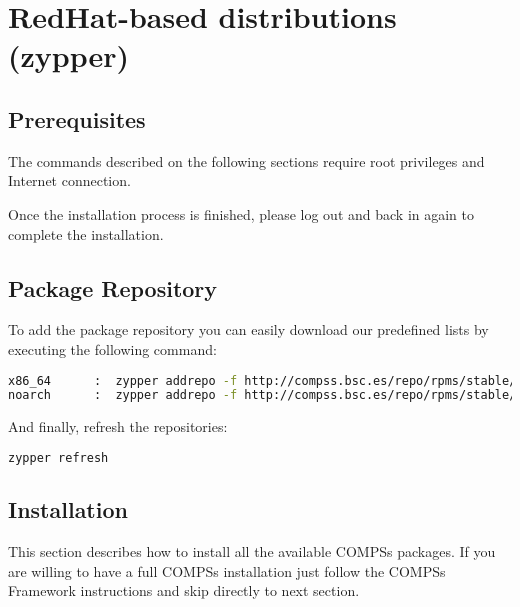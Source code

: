 \section{RedHat-based distributions (zypper)}
\label{sec:RedHat_zypper}


\subsection{Prerequisites}
The commands described on the following sections require root privileges and Internet connection.

Once the installation process is finished, please log out and back in again to complete the installation. 

\subsection{Package Repository}
To add the package repository you can easily download our predefined lists by executing the following command:
\begin{lstlisting}[language=bash]
x86_64      :  zypper addrepo -f http://compss.bsc.es/repo/rpms/stable/suse/x86_64 compss
noarch      :  zypper addrepo -f http://compss.bsc.es/repo/rpms/stable/suse/noarch compss
\end{lstlisting}

And finally, refresh the repositories:
\begin{lstlisting}[language=bash]
zypper refresh
\end{lstlisting}

\subsection{Installation}
This section describes how to install all the available COMPSs packages. If you are willing to have a full COMPSs installation 
just follow the COMPSs Framework instructions and skip directly to next section.


